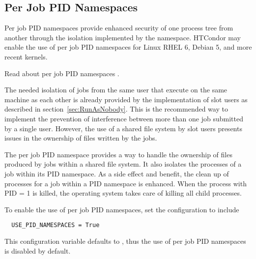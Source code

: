 \subsection{\label{sec:PIDNamespaces}Per Job PID Namespaces} 

Per job PID namespaces provide enhanced security of one process
tree from another through the isolation implemented by the namespace.
HTCondor may enable the use of per job PID namespaces for 
Linux RHEL 6, Debian 5, and more recent kernels.

Read about per job PID namespaces .

The needed isolation of jobs from the same user that execute on the
same machine as each other is already provided by the implementation
of slot users as described in section~\ref{sec:RunAsNobody}.
This is the recommended way to implement the prevention of interference
between more than one job submitted by a single user.
However, the use of a shared file system by slot users presents
issues in the ownership of files written by the jobs.

The per job PID namespace provides a way to handle the ownership
of files produced by jobs within a shared file system.
It also isolates the processes of a job within its PID namespace.
As a side effect and benefit, the clean up of processes for a job
within a PID namespace is enhanced. 
When the process with PID = 1 is killed, 
the operating system takes care of killing all child processes.

To enable the use of per job PID namespaces, 
set the configuration to include

\begin{verbatim}
  USE_PID_NAMESPACES = True
\end{verbatim}

This configuration variable defaults to ,
thus the use of per job PID namespaces is disabled by default.
